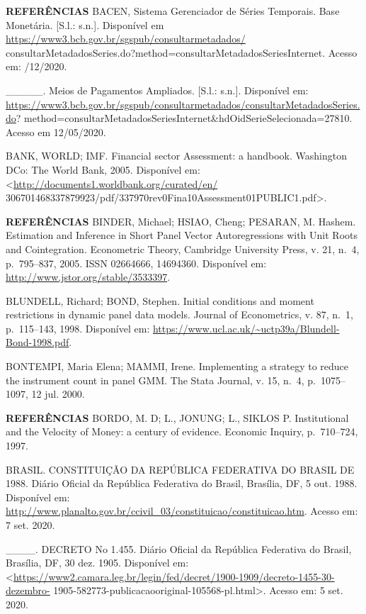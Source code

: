 \documentclass[
  ignorenonframetext,
  aspectratio=169,
  ignorenonframetext]{beamer}
\begin{document}
\begin{frame}{\textbf{REFERÊNCIAS}}
\protect\hypertarget{referuxeancias-3}{}
BACEN, Sistema Gerenciador de Séries Temporais. Base Monetária. {[}S.l.:
s.n.{]}. Disponível em
\url{https://www3.bcb.gov.br/sgspub/consultarmetadados/}
consultarMetadadosSeries.do?method=consultarMetadadosSeriesInternet.
Acesso em: /12/2020.

\_\_\_\_\_. Meios de Pagamentos Ampliados. {[}S.l.: s.n.{]}. Disponível
em:
\url{https://www3.bcb.gov.br/sgspub/consultarmetadados/consultarMetadadosSeries.do}?
method=consultarMetadadosSeriesInternet\&hdOidSerieSelecionada=27810.
Acesso em 12/05/2020.

BANK, WORLD; IMF. Financial sector Assessment: a handbook. Washington
DCo: The World Bank, 2005. Disponível em:
\textless{}\url{http://documents1.worldbank.org/curated/en/}
306701468337879923/pdf/337970rev0Fina10Assessment01PUBLIC1.pdf\textgreater.
\end{frame}

\begin{frame}{\textbf{REFERÊNCIAS}}
\protect\hypertarget{referuxeancias-4}{}
BINDER, Michael; HSIAO, Cheng; PESARAN, M. Hashem. Estimation and
Inference in Short Panel Vector Autoregressions with Unit Roots and
Cointegration. Econometric Theory, Cambridge University Press, v. 21,
n.~4, p.~795--837, 2005. ISSN 02664666, 14694360. Disponível em:
\url{http://www.jstor.org/stable/3533397}.

BLUNDELL, Richard; BOND, Stephen. Initial conditions and moment
restrictions in dynamic panel data models. Journal of Econometrics, v.
87, n.~1, p.~115--143, 1998. Disponível em:
\url{https://www.ucl.ac.uk/~uctp39a/Blundell-Bond-1998.pdf}.

BONTEMPI, Maria Elena; MAMMI, Irene. Implementing a strategy to reduce
the instrument count in panel GMM. The Stata Journal, v. 15, n.~4,
p.~1075--1097, 12 jul. 2000.
\end{frame}

\begin{frame}{\textbf{REFERÊNCIAS}}
\protect\hypertarget{referuxeancias-5}{}
BORDO, M. D; L., JONUNG; L., SIKLOS P. Institutional and the Velocity of
Money: a century of evidence. Economic Inquiry, p.~710--724, 1997.

BRASIL. CONSTITUIÇÃO DA REPÚBLICA FEDERATIVA DO BRASIL DE 1988. Diário
Oficial da República Federativa do Brasil, Brasília, DF, 5 out. 1988.
Disponível em:
\url{http://www.planalto.gov.br/ccivil_03/constituicao/constituicao.htm}.
Acesso em: 7 set. 2020.

\_\_\_\_. DECRETO No 1.455. Diário Oficial da República Federativa do
Brasil, Brasília, DF, 30 dez. 1905. Disponível em:
\textless{}\url{https://www2.camara.leg.br/legin/fed/decret/1900-1909/decreto-1455-30-dezembro-}
1905-582773-publicacaooriginal-105568-pl.html\textgreater. Acesso em: 5
set. 2020.
\end{frame}
\end{document}
